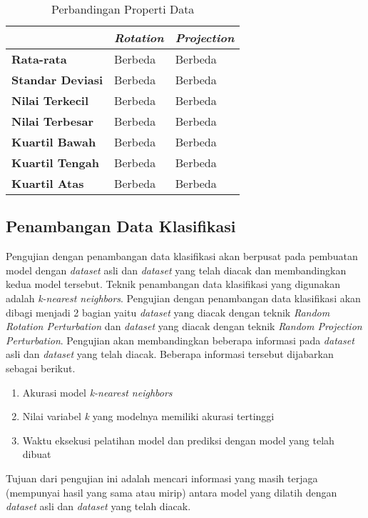 \begin{table}
	\centering
	\caption{Perbandingan Properti Data}
	\begin{tabular}{|l|l|l|}
		\hline
		& \textbf{\textit{Rotation}} & \textbf{\textit{Projection}} \\ \hline
		\textbf{Rata-rata} & Berbeda & Berbeda \\
		\textbf{Standar Deviasi} & Berbeda & Berbeda \\
		\textbf{Nilai Terkecil} & Berbeda & Berbeda \\
		\textbf{Nilai Terbesar} & Berbeda & Berbeda \\
		\textbf{Kuartil Bawah} & Berbeda & Berbeda \\
		\textbf{Kuartil Tengah} & Berbeda & Berbeda \\
		\textbf{Kuartil Atas} & Berbeda & Berbeda \\
		\hline
	\end{tabular}
	\label{table:perbandingan-properti}
\end{table}

\subsection{Penambangan Data Klasifikasi}
\label{subsec:pengujian-klasifikasi}
Pengujian dengan penambangan data klasifikasi akan berpusat pada pembuatan model dengan \textit{dataset} asli dan \textit{dataset} yang telah diacak dan membandingkan kedua model tersebut. Teknik penambangan data klasifikasi yang digunakan adalah \textit{k-nearest neighbors}. Pengujian dengan penambangan data klasifikasi akan dibagi menjadi 2 bagian yaitu \textit{dataset} yang diacak dengan teknik \textit{Random Rotation Perturbation} dan \textit{dataset} yang diacak dengan teknik \textit{Random Projection Perturbation}. Pengujian akan membandingkan beberapa informasi pada \textit{dataset} asli dan \textit{dataset} yang telah diacak. Beberapa informasi tersebut dijabarkan sebagai berikut.
\begin{enumerate}
	\item Akurasi model \textit{k-nearest neighbors}
	\item Nilai variabel \textit{k} yang modelnya memiliki akurasi tertinggi
	\item Waktu eksekusi pelatihan model dan prediksi dengan model yang telah dibuat
\end{enumerate}
Tujuan dari pengujian ini adalah mencari informasi yang masih terjaga (mempunyai hasil yang sama atau mirip) antara model yang dilatih dengan \textit{dataset} asli dan \textit{dataset} yang telah diacak.

